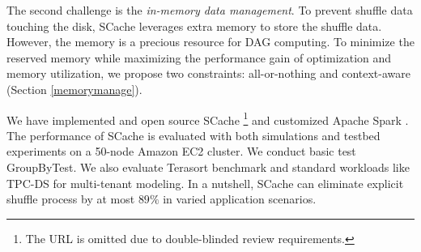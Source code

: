 The second challenge is the \textit{in-memory data management}. To prevent shuffle data touching the disk, SCache leverages extra memory to store the shuffle data. However, the memory is a precious resource for DAG computing. To minimize the reserved memory while maximizing the performance gain of optimization and memory utilization, we propose two constraints: all-or-nothing and context-aware (Section \ref{memorymanage}).

We have implemented and open source SCache \footnote{The URL is omitted due to double-blinded review requirements.} and customized Apache Spark \cite{apachespark}. The performance of SCache is evaluated with both simulations and testbed experiments on a 50-node Amazon EC2 cluster. We conduct basic test GroupByTest. We also evaluate Terasort \cite{spark-tera} benchmark and standard workloads like TPC-DS \cite{tpcds} for multi-tenant modeling. In a nutshell, SCache can eliminate explicit shuffle process by at most $89\%$ in varied application scenarios.




